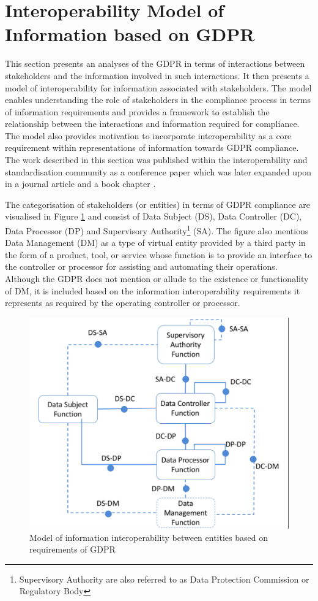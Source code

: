 \section{Interoperability Model of Information based on GDPR}\label{sec:info:model}

This section presents an analyses of the GDPR in terms of interactions between stakeholders and the information involved in such interactions. It then presents a model of interoperability for information associated with stakeholders. The model enables understanding the role of stakeholders in the compliance process in terms of information requirements and provides a framework to establish the relationship between the interactions and information required for compliance. 
The model also provides motivation to incorporate interoperability as a core requirement within representations of information towards GDPR compliance.
The work described in this section was published within the interoperability and standardisation community as a conference paper
\cite{pandit_gdpr_2018} which was later expanded upon in a journal article \cite{pandit_exploration_2018} and a book chapter \cite{}.

The categorisation of stakeholders (or entities) in terms of GDPR compliance are visualised in Figure \ref{fig:info:interoperability-model} and consist of Data Subject (DS), Data Controller (DC), Data Processor (DP) and Supervisory Authority\footnote{Supervisory Authority are also referred to as Data Protection Commission or Regulatory Body} (SA). 
The figure also mentions Data Management (DM) as a type of virtual entity provided by a third party in the form of a product, tool, or service whose function is to provide an interface to the controller or processor for assisting and automating their operations. 
Although the GDPR does not mention or allude to the existence or functionality of DM, it is included based on the information interoperability requirements it represents as required by the operating controller or processor.
\begin{figure}[htbp]
    \centering
    \includegraphics[width=0.75\linewidth]{img/interoperability-model.png}
    \caption{Model of information interoperability between entities based on requirements of GDPR \cite{pandit_exploration_2018}}
    \label{fig:info:interoperability-model}
\end{figure}

